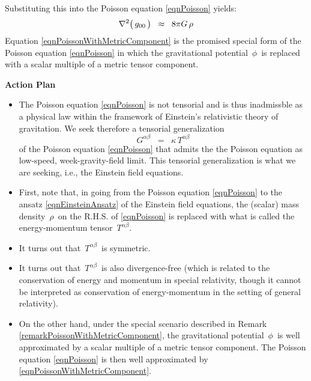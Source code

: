 \begin{remark}
\begin{equation*}
\end{equation*}
Substituting this into the Poisson equation \eqref{eqnPoisson} yields:
\begin{equation}\label{eqnPoissonWithMetricComponent}
\nabla^{2}\!\left(\,\overset{{\color{white}.}}{g_{00}}\,\right) \;\; \approx \;\; 8 \pi G \, \rho
\end{equation}
Equation \eqref{eqnPoissonWithMetricComponent} is the promised special form
of the Poisson equation \eqref{eqnPoisson}
in which the gravitational potential \,$\phi$\, is replaced with a scalar multiple of a metric tensor component.
\end{remark}


\vskip 0.3cm
\noindent
\textbf{Action Plan}
\begin{itemize}
\item
	The Poisson equation \eqref{eqnPoisson} is not tensorial and is thus inadmissble
	as a physical law within the framework of Einstein's relativistic theory of gravitation.
	We seek therefore a tensorial generalization
	\begin{equation}\label{eqnEinsteinAnsatz}
	G^{\alpha\beta} \;\; = \;\; \kappa\,T^{\alpha\beta}
	\end{equation}
	of the Poisson equation \eqref{eqnPoisson} that admits the the Poisson equation
	as low-speed, week-gravity-field limit.
	This tensorial generalization is what we are seeking, i.e.,
	the Einstein field equations.
\item
	First, note that, in going
	from the Poisson equation \eqref{eqnPoisson}
	to the ansatz \eqref{eqnEinsteinAnsatz} of the Einstein field equations,
	the (scalar) mass density \,$\rho$\, on the R.H.S. of \eqref{eqnPoisson}
	is replaced with what is called the energy-momentum tensor \,$T^{\alpha\beta}$.
\item
	It turns out that \,$T^{\alpha\beta}$\, is symmetric.
\item
	It turns out that \,$T^{\alpha\beta}$\, is also divergence-free
	(which is related to the conservation of energy and momentum in special relativity,
	though it cannot be interpreted as conservation of energy-momentum in the setting of general relativity).
\item
	On the other hand, 
	under the special scenario described in Remark \ref{remarkPoissonWithMetricComponent},
	the gravitational potential \,$\phi$\, is well approximated by a scalar multiple of a metric tensor component.
	The Poisson equation \eqref{eqnPoisson} is then well approximated by \eqref{eqnPoissonWithMetricComponent}.

\end{itemize}
